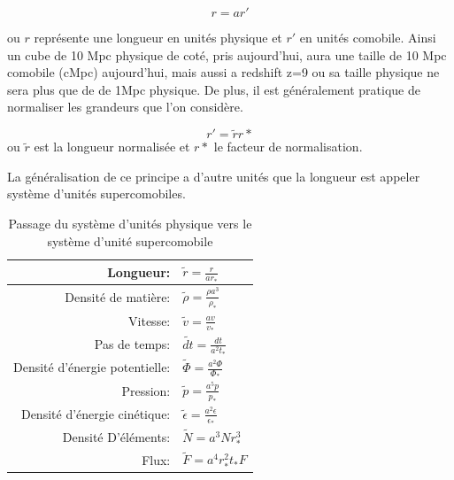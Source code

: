 \begin{equation}
r=a r'
\end{equation}

ou $r$ représente une longueur en unités physique et $r'$ en unités comobile.
Ainsi un cube de 10 Mpc physique de coté, pris aujourd'hui, aura une taille de 10 Mpc comobile (cMpc) aujourd'hui, mais aussi a redshift z=9 ou sa taille physique ne sera plus que de de 1Mpc physique.
De plus, il est généralement pratique de normaliser les grandeurs que l'on considère. 

\begin{equation}
r'=\tilde{r}r*
\end{equation}
ou $\tilde{r}$ est la longueur normalisée et $r*$ le facteur de normalisation.

La généralisation de ce principe a d'autre unités que la longueur est appeler système d'unités supercomobiles.
\citep{martel_convenient_1998}

\begin{table}[htbp]
\begin{center}
\begin{tabular}{r l} \hline 
Longueur: & $\tilde{r}=\frac{r}{ar_*}$ \\ \hline 
Densité de matière: & $\tilde{\rho}=\frac{\rho a^3}{\rho_*}$ \\ \hline 
Vitesse: & $ \tilde{v}=\frac{av}{v_*}$ \\ \hline 
Pas de temps: & $\tilde{dt}=\frac{dt}{a^2t_*}$\\ \hline 
Densité d’énergie potentielle: & $\tilde{\Phi}=\frac{a^2 \Phi}{\Phi_*}$\\ \hline 
Pression: & $\tilde{p}=\frac{a^5 p}{p_*}$\\ \hline 
Densité d’énergie cinétique: & $\tilde{\epsilon}=\frac{a^2 \epsilon}{\epsilon_*}$\\ \hline 
Densité D’éléments: & $\tilde{N}=a^3 N r_*^3$\\ \hline 
Flux: & $\tilde{F}=a^4 r_*^2 t_* F$\\ \hline 
\end{tabular} 
\end{center}
\caption{Passage du système d'unités physique vers le système d'unité supercomobile} 
\end{table}


